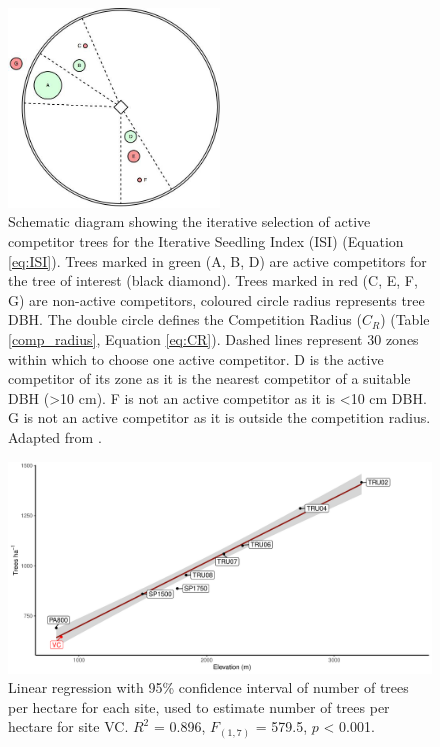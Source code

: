 \documentclass[a4paper, 11pt]{article}
\begin{document}
\begin{figure}[H]
\includegraphics[width=0.5\textwidth]{hegyi}
\centering
\caption{Schematic diagram showing the iterative selection of active competitor trees for the Iterative Seedling Index (ISI) (Equation \ref{eq:ISI}). Trees marked in green (A, B, D) are active competitors for the tree of interest (black diamond). Trees marked in red (C, E, F, G) are non-active competitors, coloured circle radius represents tree DBH. The double circle defines the Competition Radius ($C_R$) (Table \ref{comp_radius}, Equation \ref{eq:CR}). Dashed lines represent 30\textdegree{} zones within which to choose one active competitor. D is the active competitor of its zone as it is the nearest competitor of a suitable DBH (\textgreater{}10 cm). F is not an active competitor as it is \textless{}10 cm DBH. G is not an active competitor as it is outside the competition radius. Adapted from \citet{Lee2004}.}
\label{hegyi}
\end{figure}

\begin{figure}[H]
\includegraphics[width=\textwidth]{comp_radius_fit}
\centering
\caption{Linear regression with 95\% confidence interval of number of trees per hectare for each site, used to estimate number of trees per hectare for site VC. $R^2$ = 0.896, $F_{(1,7)}$ = 579.5, $p$ \textless{} 0.001.}
\label{comp_radius_fit}
\end{figure}
\end{document}
